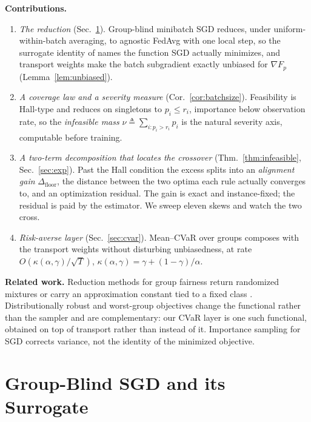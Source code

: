 \documentclass{article}
\theoremstyle{definition}
\begin{document}
\noindent\textbf{Contributions.}
\begin{enumerate}\itemsep0pt\parskip0pt
\item \emph{The reduction} (Sec.~\ref{sec:setup}). Group-blind minibatch SGD reduces, under
uniform-within-batch averaging, to agnostic \textsf{FedAvg} with one local step, so the surrogate identity of
\cite{rahimi2025agnostic} names the function SGD actually minimizes, and
transport weights make the batch subgradient exactly unbiased for $\nabla F_p$
(Lemma~\ref{lem:unbiased}).
\item \emph{A coverage law and a severity measure} (Cor.~\ref{cor:batchsize}).
Feasibility is Hall-type and reduces on singletons to $p_i\le r_i$, importance
below observation rate, so the \emph{infeasible mass}
$\nu\triangleq\sum_{i:p_i>r_i}p_i$ is the natural severity axis, computable
before training.
\item \emph{A two-term decomposition that locates the crossover}
(Thm.~\ref{thm:infeasible}, Sec.~\ref{sec:exp}). Past the Hall condition the
excess splits into an \emph{alignment gain} $\Delta_{\mathrm{floor}}$, the
distance between the two optima each rule actually converges to, and an
optimization residual. The gain is exact and instance-fixed; the residual is
paid by the estimator. We sweep eleven skews and watch the two cross.
\item \emph{Risk-averse layer} (Sec.~\ref{sec:cvar}). Mean--CVaR over groups
composes with the transport weights without disturbing unbiasedness, at rate
$O(\kappa(\alpha,\gamma)/\sqrt{T})$,
$\kappa(\alpha,\gamma)=\gamma+(1-\gamma)/\alpha$.
\end{enumerate}

\noindent\textbf{Related work.}
Reduction methods for group fairness return randomized mixtures or carry an
approximation constant tied to a fixed class
\cite{agarwal2018reductions,cotter2019twoplayer,chamon2020pacc}.
Distributionally robust and worst-group objectives
\cite{sagawa2020dro,hashimoto2018repeated,levy2020large} change the functional
rather than the sampler and are complementary: our CVaR layer is one such
functional, obtained on top of transport rather than instead of it. Importance
sampling for SGD \cite{rizk2021importance,katharopoulos2018not} corrects
variance, not the identity of the minimized objective.

\section{Group-Blind SGD and its Surrogate}
\label{sec:setup}
\end{document}
